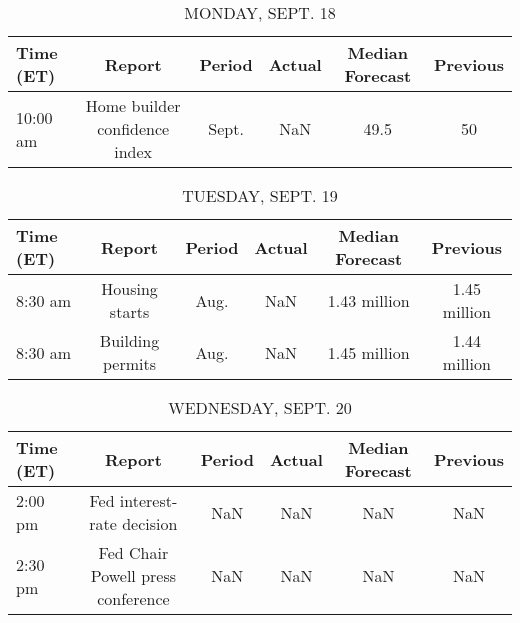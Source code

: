 \documentclass{article}%
\begin{document}
%
\normalsize%


\begin{table}[htbp]%
\caption{MONDAY, SEPT. 18}%
\centering%
\begin{adjustbox}{width=1\textwidth}%
\begin{tabular}{lccccc}
\toprule
Time (ET) &                        Report & Period & Actual & Median Forecast & Previous \\
\midrule
 10:00 am & Home builder confidence index &  Sept. &    NaN &            49.5 &       50 \\
\bottomrule
\end{tabular}
%
\end{adjustbox}%
\end{table}

%


\begin{table}[htbp]%
\caption{TUESDAY, SEPT. 19}%
\centering%
\begin{adjustbox}{width=1\textwidth}%
\begin{tabular}{lccccc}
\toprule
Time (ET) &           Report & Period & Actual & Median Forecast &     Previous \\
\midrule
  8:30 am &   Housing starts &   Aug. &    NaN &    1.43 million & 1.45 million \\
  8:30 am & Building permits &   Aug. &    NaN &    1.45 million & 1.44 million \\
\bottomrule
\end{tabular}
%
\end{adjustbox}%
\end{table}

%


\begin{table}[htbp]%
\caption{WEDNESDAY, SEPT. 20}%
\centering%
\begin{adjustbox}{width=1\textwidth}%
\begin{tabular}{lccccc}
\toprule
Time (ET) &                            Report & Period & Actual & Median Forecast & Previous \\
\midrule
  2:00 pm &        Fed interest-rate decision &    NaN &    NaN &             NaN &      NaN \\
  2:30 pm & Fed Chair Powell press conference &    NaN &    NaN &             NaN &      NaN \\
\bottomrule
\end{tabular}
%
\end{adjustbox}%
\end{table}
\end{document}
